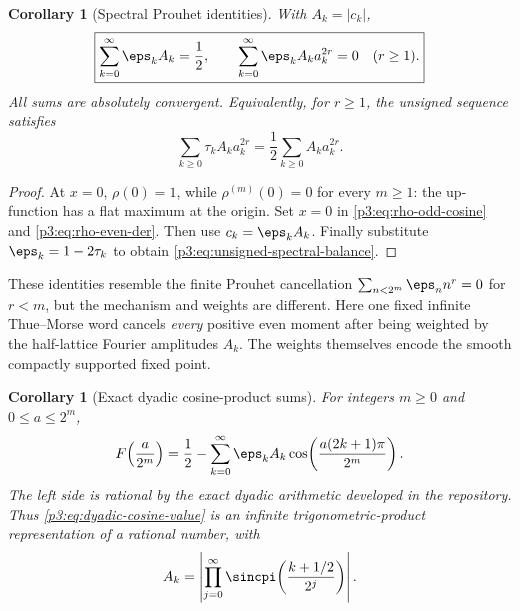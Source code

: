\documentclass[11pt,oneside]{article}
\newtheorem{corollary}[theorem]{Corollary}
\theoremstyle{definition}
\begin{document}
\begin{corollary}[Spectral Prouhet identities]
\label{p3:cor:spectral-prouhet}
With \(A_k=|c_k|\),
\begin{equation}
\boxed{
 \sum_{k=0}^{\infty}\eps_kA_k=\frac12,
 \qquad
 \sum_{k=0}^{\infty}\eps_kA_ka_k^{2r}=0\quad(r\ge1).}     \label{p3:eq:spectral-prouhet}
\end{equation}
All sums are absolutely convergent.  Equivalently, for \(r\ge1\), the unsigned sequence
satisfies
\begin{equation}
 \sum_{k\ge0}\tau_kA_ka_k^{2r}
 =\frac12\sum_{k\ge0}A_ka_k^{2r}.                         \label{p3:eq:unsigned-spectral-balance}
\end{equation}
\end{corollary}

\begin{proof}
At \(x=0\), \(\rho(0)=1\), while \(\rho^{(m)}(0)=0\) for every \(m\ge1\): the up-function
has a flat maximum at the origin.  Set \(x=0\) in \eqref{p3:eq:rho-odd-cosine} and
\eqref{p3:eq:rho-even-der}.  Then use \(c_k=\eps_kA_k\).  Finally substitute
\(\eps_k=1-2\tau_k\) to obtain \eqref{p3:eq:unsigned-spectral-balance}.
\end{proof}

These identities resemble the finite Prouhet cancellation
\(\sum_{n<2^m}\eps_nn^r=0\) for \(r<m\), but the mechanism and weights are different.
Here one fixed infinite Thue--Morse word cancels \emph{every} positive even moment after
being weighted by the half-lattice Fourier amplitudes \(A_k\).  The weights themselves
encode the smooth compactly supported fixed point.

\begin{corollary}[Exact dyadic cosine-product sums]
\label{p3:cor:dyadic-cosine-products}
For integers \(m\ge0\) and \(0\le a\le2^m\),
\begin{equation}
 F\!\left(\frac{a}{2^m}\right)
 =\frac12-\sum_{k=0}^{\infty}\eps_kA_k
   \cos\!\left(\frac{a(2k+1)\pi}{2^m}\right).             \label{p3:eq:dyadic-cosine-value}
\end{equation}
The left side is rational by the exact dyadic arithmetic developed in the repository.
Thus \eqref{p3:eq:dyadic-cosine-value} is an infinite trigonometric-product representation of
a rational number, with
\begin{equation}
 A_k=\left|
 \prod_{j=0}^{\infty}
 \sincpi\!\left(\frac{k+1/2}{2^j}\right)
 \right|.                                                   \label{p3:eq:Ak-product}
\end{equation}
\end{corollary}
\end{document}
